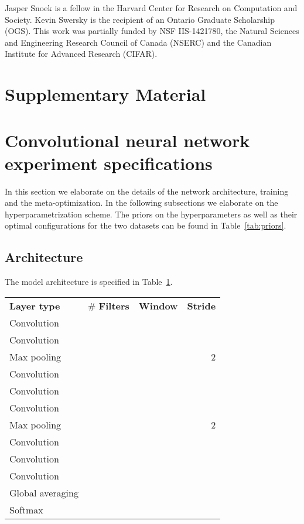 \documentclass{article}
\begin{document}
Jasper Snoek is a fellow in the Harvard Center for Research on Computation and Society. Kevin Swersky is the recipient of an Ontario Graduate Scholarship (OGS). This work was partially funded by NSF IIS-1421780, the Natural Sciences and Engineering Research Council of Canada (NSERC) and the Canadian Institute for Advanced Research (CIFAR).

\small



\section*{Supplementary Material}
\appendix
\section{Convolutional neural network experiment specifications}
In this section we elaborate on the details of the network architecture, training and the meta-optimization. In the following subsections we elaborate on the hyperparametrization scheme. The priors on the hyperparameters as well as their optimal configurations for the two datasets can be found in Table~\ref{tab:priors}.

\subsection{Architecture}
The model architecture is specified in Table~\ref{tab:architecture}.  

\begin{table}[ht]
  \centering
  \small{
  \begin{tabular}[b]{lrrr}  
    \toprule
    {\bf Layer type} & \# {\bf Filters} & {\bf Window} & {\bf Stride}\\\cmidrule(r){1-4}Convolution &  &  & \\
    \cmidrule(r){1-4}Convolution &  &  & \\
    \cmidrule(r){1-4}Max pooling & &  & 2 \\
    \cmidrule(r){1-4}Convolution &  &  & \\
    \cmidrule(r){1-4}Convolution &  &  & \\
    \cmidrule(r){1-4}Convolution &  &  & \\
    \cmidrule(r){1-4}Max pooling & &  & 2 \\
    \cmidrule(r){1-4}Convolution &  &  & \\
    \cmidrule(r){1-4}Convolution &  &  & \\
    \cmidrule(r){1-4}Convolution &  &  & \\
    \cmidrule(r){1-4}Global averaging & &  & \\
    \cmidrule(r){1-4}Softmax & & & \\
   \bottomrule 

  \end{tabular}}
  \captionsetup[table]{position=bottom}
  \label{tab:architecture}
\end{table}
\end{document}
